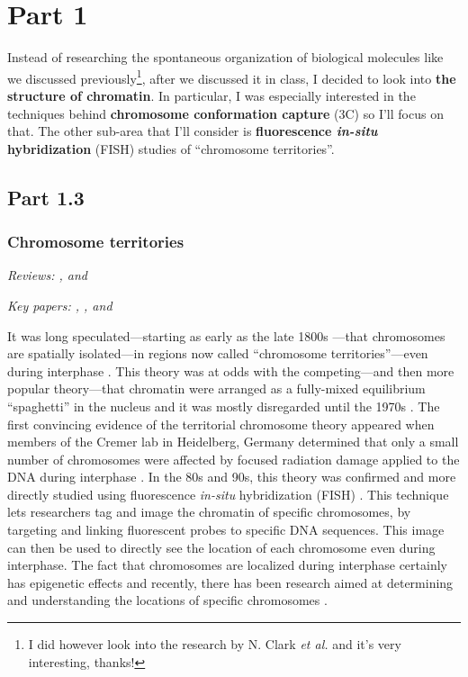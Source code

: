 \documentclass[12pt]{article}
\begin{document}
\section*{Part 1}

Instead of researching the spontaneous organization of biological molecules
like we discussed previously\footnote{I did however look into the research by
N. Clark \emph{et al.} and it's very interesting, thanks!}, after we discussed
it in class, I decided to look into {\bf the structure of chromatin}.
In particular, I was especially interested in the techniques behind
{\bf chromosome conformation capture} (3C) so I'll focus on that.
The other sub-area that I'll consider is {\bf fluorescence \emph{in-situ}
hybridization} (FISH) studies of ``chromosome territories''.

\subsection*{Part 1.3}

\subsubsection*{Chromosome territories}

\emph{Reviews: \cite{ct-review3}, \cite{ct-review2} and \cite{ct-review1}}

\noindent\emph{Key papers: \cite{hamster}, \cite{cremer}, and \cite{local}}

It was long speculated---starting as early as the late 1800s
\cite{old}---that chromosomes are spatially isolated---in regions now called
``chromosome territories''---even during interphase \cite{ct-review1,
ct-review2}.
This theory was at odds with the competing---and then more popular
theory---that chromatin were arranged as a fully-mixed equilibrium
``spaghetti'' in the nucleus and it was mostly disregarded until the 1970s
\cite{cremer}.
The first convincing evidence of the territorial chromosome theory appeared
when members of the Cremer lab in Heidelberg, Germany determined that only a
small number of chromosomes were affected by focused radiation damage applied
to the DNA during interphase \cite{zorn, hamster}.
In the 80s and 90s, this theory was confirmed and more directly studied using
fluorescence \emph{in-situ} hybridization (FISH) \cite{cremer}.
This technique lets researchers tag and image the chromatin of specific
chromosomes, by targeting and linking fluorescent probes to specific DNA
sequences.
This image can then be used to directly see the location of each chromosome
even during interphase.
The fact that chromosomes are localized during interphase certainly has
epigenetic effects and recently, there has been research aimed at determining
and understanding the locations of specific chromosomes \cite{local}.
\end{document}
